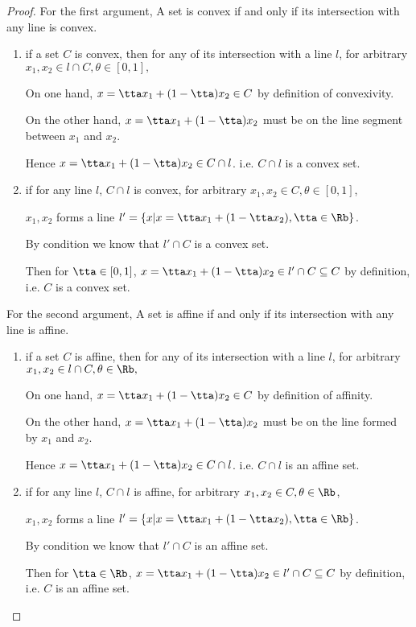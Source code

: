 \begin{proof}

For the first argument, A set is convex if and only if its intersection with any line is convex.

\begin{enumerate}
\item{
if a set $C$ is convex, then for any of its intersection with a line $l$, for arbitrary $x_1, x_2 \in l \cap C, \theta \in [0,1],$

On one hand, $x = \tta x_1 + (1-\tta) x_2 \in C$ by definition of convexivity.

On the other hand, $x = \tta x_1 + (1-\tta) x_2$ must be on the line segment between $x_1$ and $x_2$.

Hence $x = \tta x_1 + (1-\tta) x_2 \in C \cap l$. i.e. $C \cap l$ is a convex set.}
\item{
if for any line $l$, $C \cap l$ is convex, for arbitrary $x_1, x_2 \in C, \theta \in [0,1]$,

$x_1, x_2$ forms a line $l' = \{x \vert x = \tta x_1 + (1 - \tta x_2), \tta \in \Rb \}$.

By condition we know that $l' \cap C$ is a convex set.

Then for $\tta \in [0,1]$, $x = \tta x_1 + (1-\tta) x_2 \in l' \cap C \subseteq C$ by definition, i.e. $C$ is a convex set.}
\end{enumerate}

For the second argument, A set is affine if and only if its intersection with any line is affine.

\begin{enumerate}
\item{
if a set $C$ is affine, then for any of its intersection with a line $l$, for arbitrary $x_1, x_2 \in l \cap C, \theta \in \Rb,$

On one hand, $x = \tta x_1 + (1-\tta) x_2 \in C$ by definition of affinity.

On the other hand, $x = \tta x_1 + (1-\tta) x_2$ must be on the line formed by $x_1$ and $x_2$.

Hence $x = \tta x_1 + (1-\tta) x_2 \in C \cap l$. i.e. $C \cap l$ is an affine set.}
\item{
if for any line $l$, $C \cap l$ is affine, for arbitrary $x_1, x_2 \in C, \theta \in \Rb$,

$x_1, x_2$ forms a line $l' = \{x \vert x = \tta x_1 + (1 - \tta x_2), \tta \in \Rb \}$.

By condition we know that $l' \cap C$ is an affine set.

Then for $\tta \in \Rb$, $x = \tta x_1 + (1-\tta) x_2 \in l' \cap C \subseteq C$ by definition, i.e. $C$ is an affine set.}
\end{enumerate}
\end{proof}




